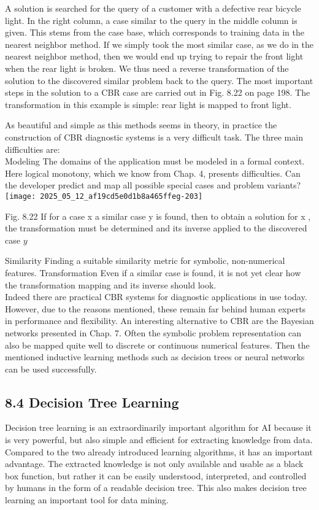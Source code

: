 \documentclass[10pt]{article}
\begin{document}
A solution is searched for the query of a customer with a defective rear bicycle light. In the right column, a case similar to the query in the middle column is given. This stems from the case base, which corresponds to training data in the nearest neighbor method. If we simply took the most similar case, as we do in the nearest neighbor method, then we would end up trying to repair the front light when the rear light is broken. We thus need a reverse transformation of the solution to the discovered similar problem back to the query. The most important steps in the solution to a CBR case are carried out in Fig. 8.22 on page 198. The transformation in this example is simple: rear light is mapped to front light.

As beautiful and simple as this methods seems in theory, in practice the construction of CBR diagnostic systems is a very difficult task. The three main difficulties are:\\
Modeling The domains of the application must be modeled in a formal context. Here logical monotony, which we know from Chap. 4, presents difficulties. Can the developer predict and map all possible special cases and problem variants?\\
\texttt{[image: 2025\_05\_12\_af19cd5e0d1b8a465ffeg-203]}

Fig. 8.22 If for a case x a similar case y is found, then to obtain a solution for x , the transformation must be determined and its inverse applied to the discovered case $y$

Similarity Finding a suitable similarity metric for symbolic, non-numerical features. Transformation Even if a similar case is found, it is not yet clear how the transformation mapping and its inverse should look.\\
Indeed there are practical CBR systems for diagnostic applications in use today. However, due to the reasons mentioned, these remain far behind human experts in performance and flexibility. An interesting alternative to CBR are the Bayesian networks presented in Chap. 7. Often the symbolic problem representation can also be mapped quite well to discrete or continuous numerical features. Then the mentioned inductive learning methods such as decision trees or neural networks can be used successfully.

\subsection*{8.4 Decision Tree Learning}
Decision tree learning is an extraordinarily important algorithm for AI because it is very powerful, but also simple and efficient for extracting knowledge from data. Compared to the two already introduced learning algorithms, it has an important advantage. The extracted knowledge is not only available and usable as a black box function, but rather it can be easily understood, interpreted, and controlled by humans in the form of a readable decision tree. This also makes decision tree learning an important tool for data mining.
\end{document}

